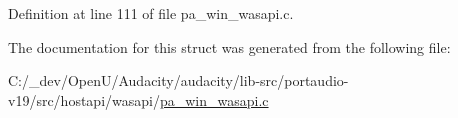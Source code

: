 Definition at line 111 of file pa\+\_\+win\+\_\+wasapi.\+c.



The documentation for this struct was generated from the following file\+:\begin{DoxyCompactItemize}
\item 
C\+:/\+\_\+dev/\+Open\+U/\+Audacity/audacity/lib-\/src/portaudio-\/v19/src/hostapi/wasapi/\hyperlink{pa__win__wasapi_8c}{pa\+\_\+win\+\_\+wasapi.\+c}\end{DoxyCompactItemize}
